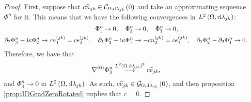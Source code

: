 \begin{proof}
	First, suppose that $c\widehat{n}_{jk}\in\mathcal{C}_{ \Omega, \mathrm{d}\lambda_{jk}}\left( 0 \right)$ and take an approximating sequence $\Phi^n$ for it.
	This means that we have the following convergences in $L^{2}\left( \Omega,\mathrm{d} \lambda_{jk} \right)$:
	\begin{align*}
		\Phi^n_1 \rightarrow 0, \quad
		\Phi^n_2 &\rightarrow 0, \quad
		\Phi^n_3 \rightarrow 0, \\
		\partial_2\Phi^n_3 - \mathrm{i}\kappa\Phi^n_2 \rightarrow c n_1^{(jk)} = c e_2^{(jk)}, \quad
		\partial_1\Phi^n_3 - \mathrm{i}\kappa\Phi^n_1 &\rightarrow -c n_2^{(jk)} = c e_1^{(jk)}, \quad
		\partial_1\Phi^n_2 - \partial_2\Phi^n_1 \rightarrow 0.
	\end{align*}
	Therefore, we have that
	\begin{align*}
		\nabla^{(0)}\Phi^n_3 \overset{L^{2}\left( \Omega,\mathrm{d} \lambda_{jk} \right)^2}{\longrightarrow} c \widehat{e}_{jk},
	\end{align*}
	and $\Phi^n_3\rightarrow 0$ in $L^{2}\left( \Omega,\mathrm{d} \lambda_{jk} \right)$.
	As such, $c\widehat{e}_{jk}\in\mathcal{G}_{ \Omega, \mathrm{d}\lambda_{jk}}\left( 0 \right)$, and then proposition \ref{prop:3DGradZeroRotated} implies that $c=0$.
	

\end{proof}
